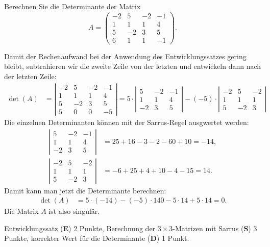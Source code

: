 Berechnen Sie die Determinante der Matrix
\[
A
=
\begin{pmatrix}
-2& 5&-2&-1\\
 1& 1& 1& 4\\
 5&-2& 3& 5\\
 6& 1& 1&-1
\end{pmatrix}.
\]


\begin{loesung}
Damit der Rechenaufwand bei der Anwendung des Entwicklungssatzes gering bleibt, subtrahieren wir die zweite Zeile von der letzten und entwickeln dann
nach der letzten Zeile:
\begin{align*}
\det(A)
&=
\left|\begin{matrix}
-2& 5&-2&-1\\
 1& 1& 1& 4\\
 5&-2& 3& 5\\
 5& 0& 0&-5
\end{matrix}\right|
=
5\cdot
\left|\begin{matrix}
 5&-2&-1\\
 1& 1& 4\\
-2& 3& 5
\end{matrix}\right|
-(-5)\cdot
\left|\begin{matrix}
-2& 5&-2\\
 1& 1& 1\\
 5&-2& 3
\end{matrix}\right|
\end{align*}
Die einzelnen Determinanten können mit der Sarrus-Regel ausgwertet werden:
\begin{align*}
\left|\begin{matrix}
 5&-2&-1\\
 1& 1& 4\\
-2& 3& 5
\end{matrix}\right|
&=
25+16-3 -2-60+10
=
-14,
\\
\left|\begin{matrix}
-2& 5&-2\\
 1& 1& 1\\
 5&-2& 3
\end{matrix}\right|
&=
-6+25+4+10-4-15
=
14.
\end{align*}
Damit kann man jetzt die Determinante berechnen:
\begin{align*}
\det(A)
&=
5\cdot (-14)-(-5)\cdot 14
0
-5\cdot 14 + 5\cdot 14 =0.
\end{align*}
Die Matrix $A$ ist also singulär.
\end{loesung}

\begin{bewertung}
Entwicklungssatz ({\bf E}) 2 Punkte,
Berechnung der $3\times 3$-Matrizen mit Sarrus ({\bf S}) 3 Punkte,
korrekter Wert für die Determinante ({\bf D}) 1 Punkt.
\end{bewertung}

